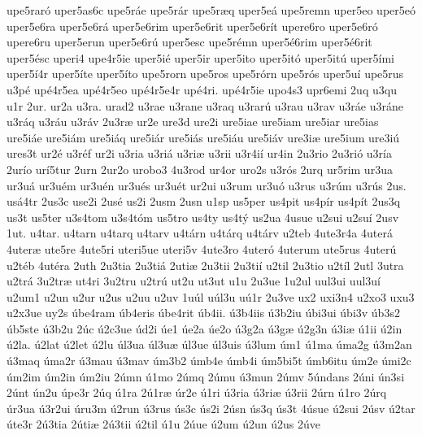 {upe5rar^^f3
uper5as6c
upe5r^^e1e
upe5r^^e1r
upe5r^^e6q
uper5e^^e1
upe5remn
uper5eo
uper5e^^f3
uper5e6ra
uper5e6r^^e1
uper5e6rim
uper5e6rit
uper5e6r^^edt
upere6ro
uper5e6r^^f3
upere6ru
uper5erun
uper5e6r^^fa
uper5esc
upe5r^^e9mn
uper5^^e96rim
uper5^^e96rit
uper5^^e9sc
uperi4
upe4r5ie
uper5i^^e9
uper5ir
uper5ito
uper5it^^f3
uper5it^^fa
uper5^^edmi
uper5^^ed4r
uper5^^edte
uper5^^edto
upe5rorn
upe5ros
upe5r^^f3rn
upe5r^^f3s
uper5u^^ed
upe5rus
u3p^^e9
up^^e94r5ea
up^^e94r5eo
up^^e94r5e4r
up^^e94ri.
up^^e94r5ie
upo4s3
upr6emi
2uq
u3qu
u1r
2ur.
ur2a
u3ra.
urad2
u3rae
u3rane
u3raq
u3rar^^fa
u3rau
u3rav
u3r^^e1e
u3r^^e1ne
u3r^^e1q
u3r^^e1u
u3r^^e1v
2u3r^^e6
ur2e
ure3d
ure2i
ure5iae
ure5iam
ure5iar
ure5ias
ure5i^^e1e
ure5i^^e1m
ure5i^^e1q
ure5i^^e1r
ure5i^^e1s
ure5i^^e1u
ure5i^^e1v
ure3i^^e6
ure5ium
ure3i^^fa
ures3t
ur2^^e9
u3r^^e9f
ur2i
u3ria
u3ri^^e1
u3ri^^e6
u3rii
u3r4i^^ed
ur4in
2u3rio
2u3ri^^f3
u3r^^eda
2ur^^edo
ur^^ed5tur
2urn
2ur2o
urobo3
4u3rod
ur4or
uro2s
u3r^^f3s
2urq
ur5rim
ur3ua
ur3u^^e1
ur3u^^e9m
ur3u^^e9n
ur3u^^e9s
ur3u^^e9t
ur2ui
u3rum
ur3u^^f3
u3rus
u3r^^fam
u3r^^fas
2us.
us^^e14tr
2us3c
use2i
2us^^e9
us2i
2usm
2usn
u1sp
us5per
us4pit
us4p^^edr
us4p^^edt
2us3q
us3t
us5ter
u3s4tom
u3s4t^^f3m
us5tro
us4ty
us4t^^fd
us2ua
4usue
u2sui
u2su^^ed
2usv
1ut.
u4tar.
u4tarn
u4tarq
u4tarv
u4t^^e1rn
u4t^^e1rq
u4t^^e1rv
u2teb
4ute3r4a
4uter^^e1
4uter^^e6
ute5re
4ute5ri
uteri5ue
uteri5v
4ute3ro
4uter^^f3
4uterum
ute5rus
4uter^^fa
u2t^^e9b
4ut^^e9ra
2uth
2u3tia
2u3ti^^e1
2uti^^e6
2u3tii
2u3ti^^ed
u2til
2u3tio
u2t^^edl
2utl
3utra
u2tr^^e1
3u2tr^^e6
ut4ri
3u2tru
u2tr^^fa
ut2u
ut3ut
u1u
2u3ue
1u2ul
uul3ui
uul3u^^ed
u2um1
u2un
u2ur
u2us
u2uu
u2uv
1u^^fal
u^^fal3u
u^^fa1r
2u3ve
ux2
uxi3n4
u2xo3
uxu3
u2x3ue
uy2s
^^fabe4ram
^^fab4eris
^^fabe4rit
^^fab4ii.
^^fa3b4iis
^^fa3b2iu
^^fabi3ui
^^fabi3v
^^fab3s2
^^fab5ste
^^fa3b2u
2^^fac
^^fa2c3ue
^^fad2i
^^fae1
^^fae2a
^^fae2o
^^fa3g2a
^^fa3g^^e6
^^fa2g3n
^^fa3i^^e6
^^fa1ii
^^fa2in
^^fa2la.
^^fa2lat
^^fa2let
^^fa2lu
^^fal3ua
^^fal3u^^e6
^^fal3ue
^^fal3uis
^^fa3lum
^^fam1
^^fa1ma
^^fama2g
^^fa3m2an
^^fa3maq
^^fama2r
^^fa3mau
^^fa3mav
^^fam3b2
^^famb4e
^^famb4i
^^fam5bi5t
^^famb6itu
^^fam2e
^^fami2c
^^fam2im
^^fam2in
^^fam2iu
2^^famn
^^fa1mo
2^^famq
2^^famu
^^fa3mun
2^^famv
5^^fandans
2^^fani
^^fan3si
2^^fant
^^fan2u
^^fape3r
2^^faq
^^fa1ra
2^^fa1r^^e6
^^far2e
^^fa1ri
^^fa3ria
^^fa3ri^^e6
^^fa3rii
2^^farn
^^fa1ro
2^^farq
^^far3ua
^^fa3r2ui
^^faru3m
^^fa2run
^^fa3rus
^^fas3c
^^fas2i
2^^fasn
^^fas3q
^^fas3t
4^^fasue
^^fa2sui
2^^fasv
^^fa2tar
^^fate3r
2^^fa3tia
2^^fati^^e6
2^^fa3tii
^^fa2til
^^fa1u
2^^faue
^^fa2um
^^fa2un
^^fa2us
2^^fave
}
